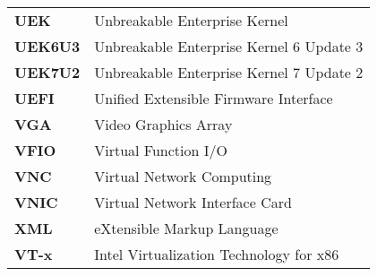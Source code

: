 \begin{longtable}{l l}
    \textbf{UEK} & Unbreakable Enterprise Kernel \\
    \textbf{UEK6U3} & Unbreakable Enterprise Kernel 6 Update 3 \\
    \textbf{UEK7U2} & Unbreakable Enterprise Kernel 7 Update 2 \\
    \textbf{UEFI} & Unified Extensible Firmware Interface \\
    \textbf{VGA} & Video Graphics Array \\
    \textbf{VFIO} & Virtual Function I/O \\
    \textbf{VNC} & Virtual Network Computing \\
    \textbf{VNIC} & Virtual Network Interface Card \\
    \textbf{XML} & eXtensible Markup Language \\
    \textbf{VT-x} & Intel Virtualization Technology for x86 \\
\end{longtable}
    